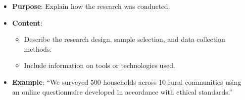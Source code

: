 \documentclass[aspectratio=169]{beamer}
\begin{document}
\begin{frame}[fragile]
\begin{enumerate}
\begin{itemize}
                \item \textbf{Purpose}: Explain how the research was conducted.
                \item \textbf{Content}:
                    \begin{itemize}
                        \item Describe the research design, sample selection, and data collection methods.
                        \item Include information on tools or technologies used.
                    \end{itemize}
                \item \textbf{Example}: ``We surveyed 500 households across 10 rural communities using an online questionnaire developed in accordance with ethical standards.''
            \end{itemize}
    \end{enumerate}
\end{frame}
\end{document}

